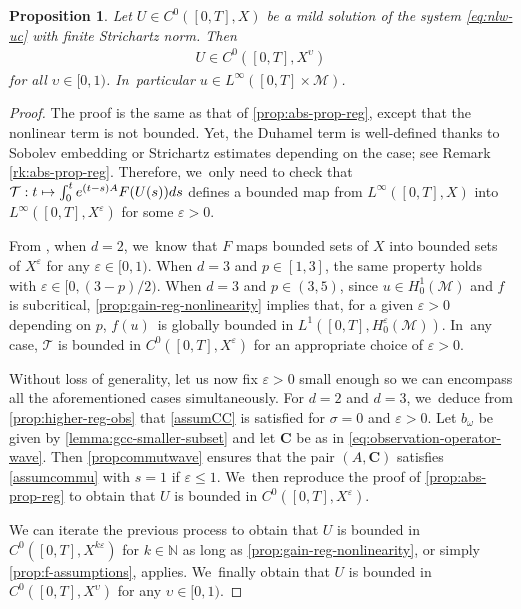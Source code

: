 \documentclass[JEP,XML,SOM,Unicode,published]{cedram}
\newcommand\mto{\mathchoice{\longmapsto}{\mapsto}{\mapsto}{\mapsto}}
\newtheorem{proposition}[theorem]{Proposition}
\theoremstyle{definition}
\let\mc\mathcal
\let\veps\varepsilon
\newcommand{\M}{\mc{M}}
\newcommand{\T}{\mc{T}}
\newcommand{\N}{\mathbb{N}}
\newcommand{\bC}{\boldsymbol{C}}
\begin{document}
\begin{proposition}\label{prop:propagation-regularity}
Let $U\in C^0([0, T], X)$ be a mild solution of the system \eqref{eq:nlw-uc} with finite Strichartz norm. Then
\begin{align*}
U\in C^0([0, T], X^{\upsilon})
\end{align*}
for all $\upsilon\in [0, 1)$. In~particular $u\in L^\infty([0, T]\times \M)$.
\end{proposition}

\begin{proof}
The proof is the same as that of \cref{prop:abs-prop-reg}, except that the nonlinear term is not bounded. Yet, the Duhamel term is well-defined thanks to Sobolev embedding or Strichartz estimates depending on the case; see Remark \ref{rk:abs-prop-reg}. Therefore, we~only need to check that $\T: t\mto \int_0^t e^{(t-s)A}F(U(s))ds$ defines a bounded map from $L^\infty([0, T], X)$ into $L^\infty([0, T], X^\veps)$ for some $\veps>0$.

From \cite[Prop.\,3.2]{2020:joly-laurent:decay-nlw-no-gcc}, when $d=2$, we~know that $F$ maps bounded sets of $X$ into bounded sets of $X^\veps$ for any $\veps\in [0, 1)$. When $d=3$ and $p\in [1, 3]$, the same property holds with $\veps\in [0, (3-p)/2)$. When $d=3$ and $p\in (3, 5)$, since $u\in H_0^1(\M)$ and $f$ is subcritical, \cref{prop:gain-reg-nonlinearity} implies that, for a given $\veps>0$ depending on $p$, $f(u)$~is globally bounded in $L^1([0, T], H_0^{\veps}(\M))$. In~any case, $\T$ is bounded in $C^0([0, T], X^\veps)$ for an appropriate choice of $\veps>0$.

Without loss of generality, let us now fix $\veps>0$ small enough so we can encompass all the aforementioned cases simultaneously. For $d=2$ and $d=3$, we~deduce from \cref{prop:higher-reg-obs} that \cref{assumCC} is satisfied for $\sigma=0$ and $\veps>0$. Let $b_\omega$ be given by \cref{lemma:gcc-smaller-subset} and let $\bC$ be as in \eqref{eq:observation-operator-wave}. Then \cref{propcommutwave} ensures that the pair $(A, \bC)$ satisfies \cref{assumcommu} with $s=1$ if $\veps\leq 1$. We~then reproduce the proof of \cref{prop:abs-prop-reg} to obtain that $U$ is bounded in $C^0([0, T], X^\veps)$.

We can iterate the previous process to obtain that $U$ is bounded in $C^0([0, T], X^{k\veps})$ for $k\in \N$ as long as \cref{prop:gain-reg-nonlinearity}, or simply \cref{prop:f-assumptions}, applies. We~finally obtain that $U$ is bounded in $C^0([0, T], X^\upsilon)$ for any $\upsilon\in [0, 1)$.
\end{proof}
\end{document}
